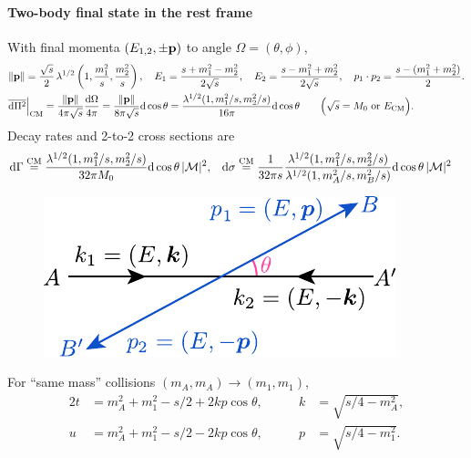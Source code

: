 \documentclass[CheatSheet]{subfiles}
\begin{document}
\paragraph{Two-body final state in the rest frame}
With final momenta $(E_{1,2},\pm{\mathbf{p}})$ to angle $\Omega=(\theta,\phi)$,
\begin{align*}
\notag&
\|\vc p\|=\frac{\sqrt{s}}{2}\Kallen[1/2]\left(1,\frac{m_1^2}{s},\frac{m_2^2}{s}\right),\quad
 E_1=\frac{s+m_1^2-m_2^2}{2\sqrt{s}},\quad
 E_2=\frac{s-m_1^2+m_2^2}{2\sqrt{s}},\quad
 p_1\cdot p_2 = \frac{s-(m_1^2+m_2^2)}{2}.
\\&
\overline{\dd\Pi^{2}}\Big|\w{CM}
=\frac{\|\vc p\|}{4\pi\sqrt{s}}\frac{\dd\Omega}{4\pi}
=
\frac{\|\vc p\|}{8\pi \sqrt{s}}\dd\cos\theta
=
\frac{\Kallen[1/2](1,m_1^2/s,m_2^2/s)}{16\pi}\dd\cos\theta
\qquad \Bigl(\text{$\sqrt s = M_0$ or $E\w{CM}$}\Bigr).
\end{align*}
Decay rates and 2-to-2 cross sections are
\begin{align}
\dd\Gamma
&\stackrel{\text{CM}}{=}
\frac{\Kallen[1/2](1,m_1^2/s,m_2^2/s)}{32\pi M_0}
  \dd\cos\theta\,|\mathcal M|^2,
&
\dd\sigma
&\stackrel{\text{CM}}{=}
\frac{1}{32\pi s}
  \frac{\Kallen[1/2](1,m_1^2/s,m_2^2/s)}{\Kallen[1/2](1,m_A^2/s,m_B^2/s)}
  \dd\cos\theta\,|\mathcal M|^2
\end{align}


\begin{figure}\vspace{-1.5em}
 \includegraphics[width=\linewidth,page=1]{figs/collision.pdf}
\end{figure}

\noindent
For ``same mass'' collisions $(m_A,m_A)\to (m_1,m_1)$,
\begin{alignat*}{2}
t &= m_A^2+m_1^2 - s/2+2kp\cos\theta,\qquad
&k&={\sqrt{s/4-m_A^2}},\\
u &= m_A^2+m_1^2 - s/2-2kp\cos\theta,
&p&={\sqrt{s/4-m_1^2}}.
\end{alignat*}
\end{document}
